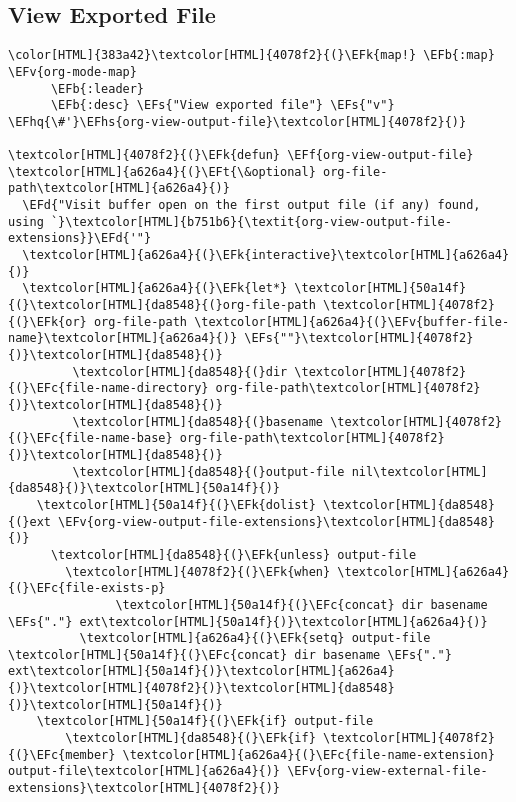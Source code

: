 \documentclass{scrartcl}
\newcommand{\EFk}[1]{\textcolor{EFk}{#1}} %
\newcommand{\EFd}[1]{\textcolor{EFd}{\textit{#1}}} %
\newcommand{\EFt}[1]{\textcolor{EFt}{#1}} %
\newcommand{\EFs}[1]{\textcolor{EFs}{#1}} %
\newcommand{\EFb}[1]{\textcolor{EFb}{#1}} %
\newcommand{\EFc}[1]{\textcolor{EFc}{#1}} %
\newcommand{\EFv}[1]{\textcolor{EFv}{#1}} %
\newcommand{\EFf}[1]{\textcolor{EFf}{#1}} %
\newcommand{\EFhq}[1]{\textcolor{EFhq}{#1}} %
\newcommand{\EFhs}[1]{\textcolor{EFhs}{#1}} %
\begin{document}
\subsection{View Exported File}
\label{sec:orga152233}
\begin{Code}
\begin{Verbatim}[]
\color[HTML]{383a42}\textcolor[HTML]{4078f2}{(}\EFk{map!} \EFb{:map} \EFv{org-mode-map}
      \EFb{:leader}
      \EFb{:desc} \EFs{"View exported file"} \EFs{"v"} \EFhq{\#'}\EFhs{org-view-output-file}\textcolor[HTML]{4078f2}{)}

\textcolor[HTML]{4078f2}{(}\EFk{defun} \EFf{org-view-output-file} \textcolor[HTML]{a626a4}{(}\EFt{\&optional} org-file-path\textcolor[HTML]{a626a4}{)}
  \EFd{"Visit buffer open on the first output file (if any) found, using `}\textcolor[HTML]{b751b6}{\textit{org-view-output-file-extensions}}\EFd{'"}
  \textcolor[HTML]{a626a4}{(}\EFk{interactive}\textcolor[HTML]{a626a4}{)}
  \textcolor[HTML]{a626a4}{(}\EFk{let*} \textcolor[HTML]{50a14f}{(}\textcolor[HTML]{da8548}{(}org-file-path \textcolor[HTML]{4078f2}{(}\EFk{or} org-file-path \textcolor[HTML]{a626a4}{(}\EFv{buffer-file-name}\textcolor[HTML]{a626a4}{)} \EFs{""}\textcolor[HTML]{4078f2}{)}\textcolor[HTML]{da8548}{)}
         \textcolor[HTML]{da8548}{(}dir \textcolor[HTML]{4078f2}{(}\EFc{file-name-directory} org-file-path\textcolor[HTML]{4078f2}{)}\textcolor[HTML]{da8548}{)}
         \textcolor[HTML]{da8548}{(}basename \textcolor[HTML]{4078f2}{(}\EFc{file-name-base} org-file-path\textcolor[HTML]{4078f2}{)}\textcolor[HTML]{da8548}{)}
         \textcolor[HTML]{da8548}{(}output-file nil\textcolor[HTML]{da8548}{)}\textcolor[HTML]{50a14f}{)}
    \textcolor[HTML]{50a14f}{(}\EFk{dolist} \textcolor[HTML]{da8548}{(}ext \EFv{org-view-output-file-extensions}\textcolor[HTML]{da8548}{)}
      \textcolor[HTML]{da8548}{(}\EFk{unless} output-file
        \textcolor[HTML]{4078f2}{(}\EFk{when} \textcolor[HTML]{a626a4}{(}\EFc{file-exists-p}
               \textcolor[HTML]{50a14f}{(}\EFc{concat} dir basename \EFs{"."} ext\textcolor[HTML]{50a14f}{)}\textcolor[HTML]{a626a4}{)}
          \textcolor[HTML]{a626a4}{(}\EFk{setq} output-file \textcolor[HTML]{50a14f}{(}\EFc{concat} dir basename \EFs{"."} ext\textcolor[HTML]{50a14f}{)}\textcolor[HTML]{a626a4}{)}\textcolor[HTML]{4078f2}{)}\textcolor[HTML]{da8548}{)}\textcolor[HTML]{50a14f}{)}
    \textcolor[HTML]{50a14f}{(}\EFk{if} output-file
        \textcolor[HTML]{da8548}{(}\EFk{if} \textcolor[HTML]{4078f2}{(}\EFc{member} \textcolor[HTML]{a626a4}{(}\EFc{file-name-extension} output-file\textcolor[HTML]{a626a4}{)} \EFv{org-view-external-file-extensions}\textcolor[HTML]{4078f2}{)}

\end{Verbatim}
\end{Code}
\end{document}
